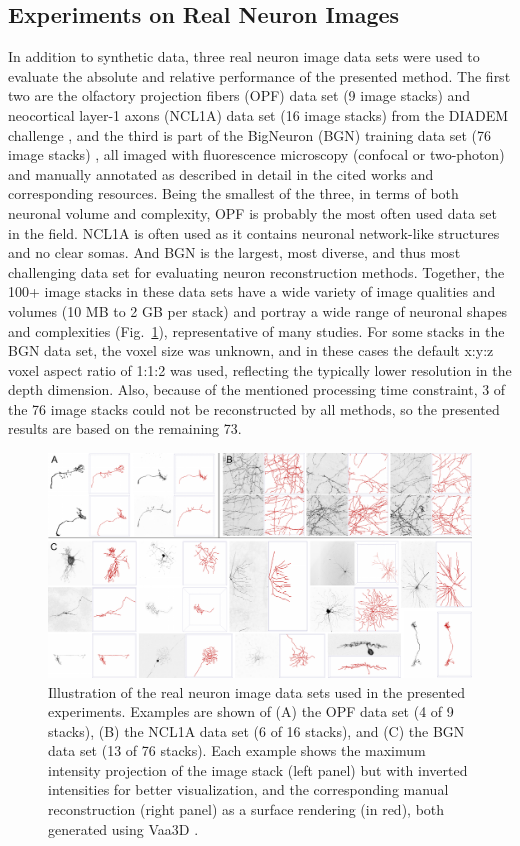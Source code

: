 \subsection{Experiments on Real Neuron Images}
\label{subsec:eval-real}
In addition to synthetic data, three real neuron image data sets were used to evaluate the absolute and relative performance of the presented method. The first two are the olfactory projection fibers (OPF) data set (9 image stacks) and neocortical layer-1 axons (NCL1A) data set (16 image stacks) from the DIADEM challenge \cite{brown2011diadem}, and the third is part of the BigNeuron (BGN) training data set (76 image stacks) \cite{peng2015bigneuron}, all imaged with fluorescence microscopy (confocal or two-photon) and manually annotated as described in detail in the cited works and corresponding resources. Being the smallest of the three, in terms of both neuronal volume and complexity, OPF is probably the most often used data set in the field. NCL1A is often used as it contains neuronal network-like structures and no clear somas. And BGN is the largest, most diverse, and thus most challenging data set for evaluating neuron reconstruction methods. Together, the 100+ image stacks in these data sets have a wide variety of image qualities and volumes (10 MB to 2 GB per stack) and portray a wide range of neuronal shapes and complexities (Fig.~\ref{ch4_fig13}), representative of many studies. For some stacks in the BGN data set, the voxel size was unknown, and in these cases the default x:y:z voxel aspect ratio of 1:1:2 was used, reflecting the typically lower resolution in the depth dimension. Also, because of the mentioned processing time constraint, 3 of the 76 image stacks could not be reconstructed by all methods, so the presented results are based on the remaining 73.
\begin{figure}
	\centering
	\includegraphics[width=\textwidth]{fig13}
	\caption{Illustration of the real neuron image data sets used in the presented experiments. Examples are shown of (A) the OPF data set (4 of 9 stacks), (B) the NCL1A data set (6 of 16 stacks), and (C) the BGN data set (13 of 76 stacks). Each example shows the maximum intensity projection of the image stack (left panel) but with inverted intensities for better visualization, and the corresponding manual reconstruction (right panel) as a surface rendering (in red), both generated using Vaa3D \cite{peng2010v3d}.}
	\label{ch4_fig13}
\end{figure}
